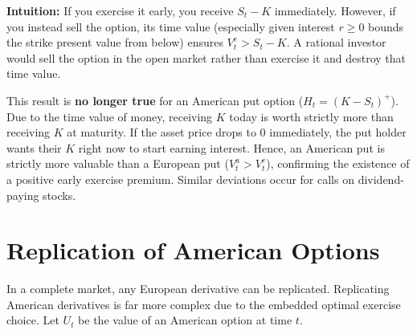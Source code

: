 \textbf{Intuition:} If you exercise it early, you receive $S_t - K$ immediately. However, if you instead sell the option, its time value (especially given interest $r \geq 0$ bounds the strike present value from below) ensures $V^e_t > S_t - K$. A rational investor would sell the option in the open market rather than exercise it and destroy that time value.

\begin{remark}
This result is \textbf{no longer true} for an American put option ($H_t = (K - S_t)^+$). Due to the time value of money, receiving $K$ today is worth strictly more than receiving $K$ at maturity. If the asset price drops to 0 immediately, the put holder wants their $K$ right now to start earning interest. Hence, an American put is strictly more valuable than a European put ($V^a_t > V^e_t$), confirming the existence of a positive early exercise premium. Similar deviations occur for calls on dividend-paying stocks.
\end{remark}

\section{Replication of American Options}

In a complete market, any European derivative can be replicated. Replicating American derivatives is far more complex due to the embedded optimal exercise choice. Let $U_t$ be the value of an American option at time $t$. 


